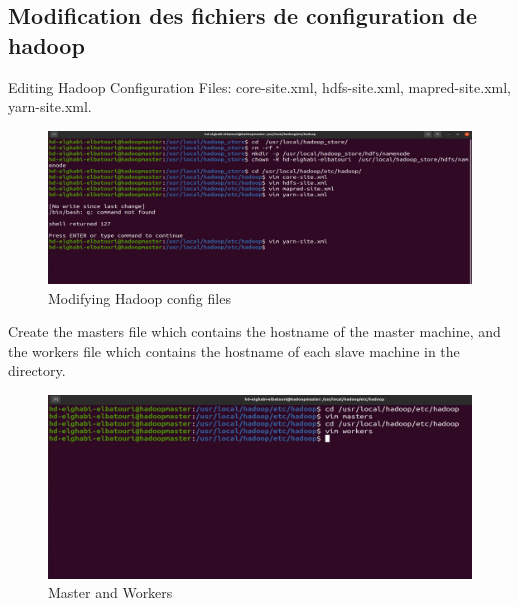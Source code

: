 \begin{spacing}{1.2}
\section{Modification des fichiers de configuration de hadoop}

\par Editing Hadoop Configuration Files: core-site.xml, hdfs-site.xml, mapred-site.xml, yarn-site.xml. 
\\
\begin{figure}[!htb] 
\begin{center} 
\includegraphics[width=1\linewidth]{Big_Data/Hadoop/Multi-Nodes Cluster/Modifying Hadoop config files} 
\end{center} 
\caption{Modifying Hadoop config files} 
\end{figure} 
\FloatBarrier



\par Create the masters file which contains the hostname of the master machine, and the workers file which contains the hostname of each slave machine in the directory.
\\
\begin{figure}[!htb] 
\begin{center} 
\includegraphics[width=1\linewidth]{Big_Data/Hadoop/Multi-Nodes Cluster/Master and Workers} 
\end{center} 
\caption{Master and Workers} 
\end{figure} 
\FloatBarrier


\end{spacing}
